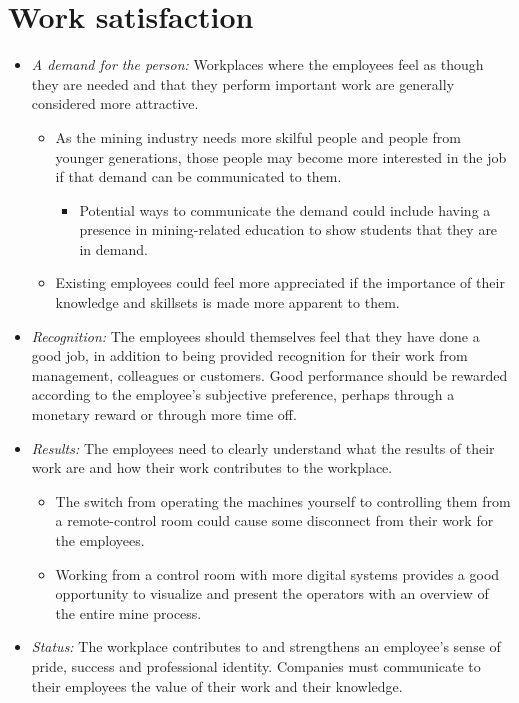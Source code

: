 \documentclass[
  12pt,
]{scrbook}
\providecommand{\tightlist}{%
  \setlength{\itemsep}{0pt}\setlength{\parskip}{0pt}}
\begin{document}
\hypertarget{work-satisfaction}{%
\section*{Work satisfaction}\label{work-satisfaction}}

\begin{itemize}
\item
  \emph{A demand for the person:} Workplaces where the employees feel as though they are needed and that they perform important work are generally considered more attractive.

  \begin{itemize}
  \item
    As the mining industry needs more skilful people and people from younger generations, those people may become more interested in the job if that demand can be communicated to them.

    \begin{itemize}
    \tightlist
    \item
      Potential ways to communicate the demand could include having a presence in mining-related education to show students that they are in demand.
    \end{itemize}
  \item
    Existing employees could feel more appreciated if the importance of their knowledge and skillsets is made more apparent to them.
  \end{itemize}
\item
  \emph{Recognition:} The employees should themselves feel that they have done a good job, in addition to being provided recognition for their work from management, colleagues or customers. Good performance should be rewarded according to the employee's subjective preference, perhaps through a monetary reward or through more time off.
\item
  \emph{Results:} The employees need to clearly understand what the results of their work are and how their work contributes to the workplace.

  \begin{itemize}
  \item
    The switch from operating the machines yourself to controlling them from a remote-control room could cause some disconnect from their work for the employees.
  \item
    Working from a control room with more digital systems provides a good opportunity to visualize and present the operators with an overview of the entire mine process.
  \end{itemize}
\item
  \emph{Status:} The workplace contributes to and strengthens an employee's sense of pride, success and professional identity. Companies must communicate to their employees the value of their work and their knowledge.


\end{itemize}
\end{document}
